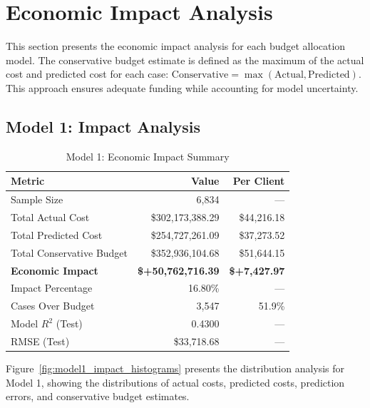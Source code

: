 
\section{Economic Impact Analysis}
\label{sec:economic_impact}

This section presents the economic impact analysis for each budget allocation model. The conservative budget estimate is defined as the maximum of the actual cost and predicted cost for each case: $\text{Conservative} = \max(\text{Actual}, \text{Predicted})$. This approach ensures adequate funding while accounting for model uncertainty.

\subsection{Model 1: Impact Analysis}
\label{subsec:model1_impact}

\begin{table}[htbp]
\centering
\small
\caption{Model 1: Economic Impact Summary}
\label{tab:model1_impact_summary}
\begin{tabular}{lrr}
\toprule
\textbf{Metric} & \textbf{Value} & \textbf{Per Client} \\
\midrule
Sample Size & 6,834 & --- \\
\midrule
Total Actual Cost & \$302,173,388.29 & \$44,216.18 \\
Total Predicted Cost & \$254,727,261.09 & \$37,273.52 \\
Total Conservative Budget & \$352,936,104.68 & \$51,644.15 \\
\midrule
\textbf{Economic Impact} & \textbf{\$+50,762,716.39} & \textbf{\$+7,427.97} \\
Impact Percentage & 16.80\% & --- \\
\midrule
Cases Over Budget & 3,547 & 51.9\% \\
\midrule
Model $R^2$ (Test) & 0.4300 & --- \\
RMSE (Test) & \$33,718.68 & --- \\
\bottomrule
\end{tabular}
\end{table}

Figure~\ref{fig:model1_impact_histograms} presents the distribution analysis for Model 1, showing the distributions of actual costs, predicted costs, prediction errors, and conservative budget estimates.

